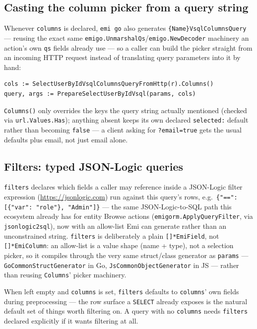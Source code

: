 \subsection{Casting the column picker from a query string}
\label{sec:vsql-columns-query}
Whenever \texttt{columns} is declared, \texttt{emi go} also generates
\texttt{\{Name\}VsqlColumnsQuery} --- reusing the exact same
\texttt{emigo.UnmarshalQs}/\texttt{emigo.NewDecoder} machinery an
action's own \texttt{qs} fields already use --- so a caller can build
the picker straight from an incoming HTTP request instead of
translating query parameters into it by hand:

\begin{lstlisting}
cols := SelectUserByIdVsqlColumnsQueryFromHttp(r).Columns()
query, args := PrepareSelectUserByIdVsql(params, cols)
\end{lstlisting}

\texttt{Columns()} only overrides the keys the query string actually
mentioned (checked via \texttt{url.Values.Has}); anything absent keeps
its own declared \texttt{selected:} default rather than becoming
\texttt{false} --- a client asking for \texttt{?email=true} gets the
usual defaults plus email, not just email alone.

\subsection{Filters: typed JSON-Logic queries}
\label{sec:vsql-filters}
\texttt{filters} declares which fields a caller may reference inside a
JSON-Logic filter expression (\url{https://jsonlogic.com}) run against
this query's rows, e.g.\ \texttt{\{"==": [\{"var": "role"\}, "Admin"]\}}
--- the same JSON-Logic-to-SQL path this ecosystem already has for
entity Browse actions (\texttt{emigorm.ApplyQueryFilter}, via
\texttt{jsonlogic2sql}), now with an allow-list Emi can generate rather
than an unconstrained string. \texttt{filters} is deliberately a plain
\texttt{[]*EmiField}, not \texttt{[]*EmiColumn}: an allow-list is a
value shape (name + type), not a selection picker, so it compiles
through the very same struct/class generator as \texttt{params} ---
\texttt{GoCommonStructGenerator} in Go, \texttt{JsCommonObjectGenerator}
in JS --- rather than reusing \texttt{Columns}' picker machinery.

When left empty and \texttt{columns} is set, \texttt{filters} defaults
to \texttt{columns}' own fields during preprocessing --- the row
surface a \texttt{SELECT} already exposes is the natural default set
of things worth filtering on. A query with no \texttt{columns} needs
\texttt{filters} declared explicitly if it wants filtering at all.

